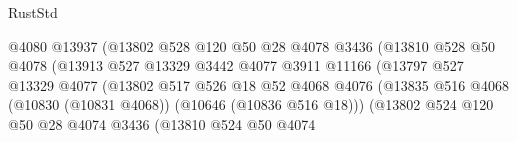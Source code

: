 \begin{lexlean}{RustStd}
\begin{coremodule}
                                          @4080
                                          @13937
                                          (@13802
                                            @528
                                            @120
                                            @50
                                            @28
                                            @4078
                                            @3436
                                            (@13810
                                              @528
                                              @50
                                              @4078
                                              (@13913
                                                @527
                                                @13329
                                                @3442
                                                @4077
                                                @3911
                                                @11166
                                                (@13797
                                                  @527
                                                  @13329
                                                  @4077
                                                  (@13802
                                                    @517
                                                    @526
                                                    @18
                                                    @52
                                                    @4068
                                                    @4076
                                                    (@13835
                                                      @516
                                                      @4068
                                                      (@10830 (@10831 @4068))
                                                      (@10646 (@10836 @516 @18)))
                                                    (@13802
                                                      @524
                                                      @120
                                                      @50
                                                      @28
                                                      @4074
                                                      @3436
                                                      (@13810
                                                        @524
                                                        @50
                                                        @4074

\end{coremodule}
\end{lexlean}
